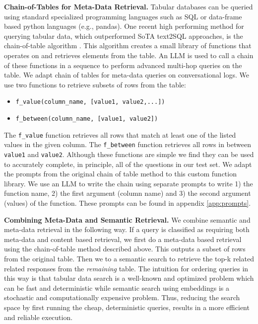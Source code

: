 \documentclass{article}
\begin{document}
\textbf{Chain-of-Tables for Meta-Data Retrieval.} Tabular databases can be queried using standard specialized programming languages such as SQL or data-frame based python languages (e.g., pandas). One recent high performing method for querying tabular data, which outperformed SoTA text2SQL approaches, is the chain-of-table algorithm \cite{wang2024chain}. This algorithm creates a small library of functions that operates on and retrieves elements from the table. An LLM is used to call a chain of these functions in a sequence to perform advanced multi-hop queries on the table. We adapt chain of tables for meta-data queries on conversational logs. We use two functions to retrieve subsets of rows from the table:
\begin{itemize}
\item \texttt{f\_value(column\_name, [value1, value2,...])} 
\item \texttt{f\_between(column\_name, [value1, value2])}
\end{itemize}
The \texttt{f\_value} function retrieves all rows that match at least one of the listed values in the given column. The \texttt{f\_between} function retrieves all rows in between \texttt{value1} and \texttt{value2}. Although these functions are simple we find they can be used to accurately complete, in principle, all of the questions in our test set. We adapt the prompts from the original chain of table method to this custom function library. We use an LLM to write the chain using separate prompts to write 1) the function name, 2) the first argument (column name) and 3) the second argument (values) of the function. These prompts can be found in appendix \ref{app:prompts}.

\textbf{Combining Meta-Data and Semantic Retrieval.} We combine semantic and meta-data retrieval in the following way. If a query is classified as requiring both meta-data and content based retrieval, we first do a meta-data based retrieval using the chain-of-table method described above. This outputs a subset of rows from the original table. Then we to a semantic search to retrieve the top-k related related responses from the \textit{remaining} table. The intuition for ordering queries in this way is that tabular data search is a well-known and optimized problem which can be fast and deterministic while semantic search using embeddings is a stochastic and computationally expensive problem. Thus, reducing the search space by first running the cheap, deterministic queries, results in a more efficient and reliable execution.
\end{document}
